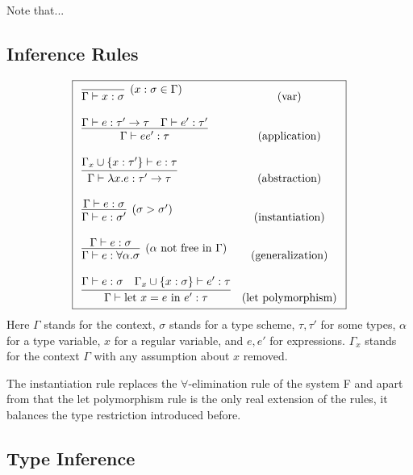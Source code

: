 Note that... %

\subsection{Inference Rules}

\begin{defn}
    $$\boxed{\begin{array}{l c}
        \infer[(x : \sigma \in \Gamma)]{\Gamma \vdash x : \sigma}{} & (\text{var}) \\\\
        \infer{\Gamma \vdash e e' : \tau}{\Gamma \vdash e : \tau' \rightarrow \tau \quad \Gamma \vdash e' : \tau'} & (\text{application}) \\\\
        \infer{\Gamma \vdash \lambda x . e : \tau' \rightarrow \tau}{\Gamma_x \cup \{x : \tau'\} \vdash e : \tau} & (\text{abstraction}) \\\\
        \infer[(\sigma > \sigma')]{\Gamma \vdash e : \sigma'}{\Gamma \vdash e : \sigma} & (\text{instantiation}) \\\\
        \infer[(\alpha \text{ not free in }\Gamma)]{\Gamma \vdash e : \forall \alpha . \sigma}{\Gamma \vdash e : \sigma} & (\text{generalization}) \\\\
        \infer{\Gamma \vdash \text{let } x = e \text{ in } e' : \tau}{\Gamma \vdash e : \sigma \quad \Gamma_x \cup \{x :\sigma\} \vdash e' : \tau} & (\text{let polymorphism})
    \end{array}}$$
    Here $\Gamma$ stands for the context, $\sigma$ stands for a type scheme, $\tau, \tau'$ for some types, $\alpha$ for a type variable, $x$ for a regular variable, and $e, e'$ for expressions. $\Gamma_x$ stands for the context $\Gamma$ with any assumption about $x$ removed.
\end{defn}

The instantiation rule replaces the $\forall$-elimination rule of the system F and apart from that the let polymorphism rule is the only real extension of the rules, it balances the type restriction introduced before.

\subsection{Type Inference}

